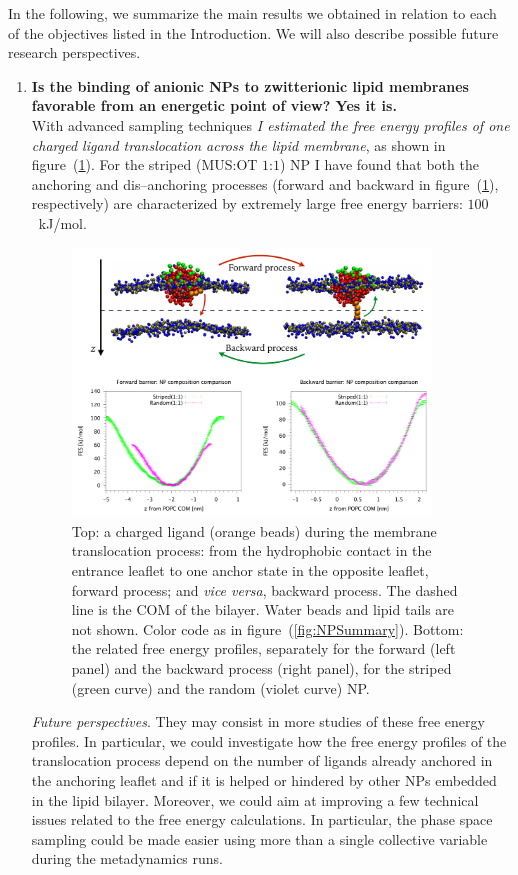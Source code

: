 In the following, we summarize the main results we obtained in relation to each of the objectives listed in the 
Introduction. We will also describe possible future research perspectives.

\begin{enumerate}[label=\itshape\roman*.,listparindent=1em]
	\item \textbf{\textsf{Is the binding of anionic \acp{NP} to zwitterionic lipid membranes favorable from an energetic point of view? Yes it is.}}\\With advanced sampling techniques \textit{I estimated the free energy profiles of one charged ligand translocation across the lipid membrane}, as shown in figure~(\ref{fig:coglionazzo}). For the striped (\acs{MUS}:\acs{OT} $1$:$1$) \ac{NP} I have found that both the anchoring and dis--anchoring processes (forward and backward in figure~(\ref{fig:coglionazzo}), respectively) are characterized by extremely large free energy barriers: $100$~kJ/mol.%
\begin{figure}[ht]
	\center
	\includegraphics[width=0.9\textwidth]{./img/coglionazzo}
	\caption{Top: a charged ligand (orange beads) during the membrane translocation process: from the hydrophobic contact in the entrance leaflet to one anchor state in the opposite leaflet, forward process; and \textit{vice versa}, backward process. The dashed line is the \acs{COM} of the bilayer. Water beads and lipid tails are not shown. Color code as in figure~(\ref{fig:NPSummary}). Bottom: the related free energy profiles, separately for the forward (left panel) and the backward process (right panel), for the striped (green curve) and the random (violet curve) \acs{NP}.}%
	\label{fig:coglionazzo}
\end{figure}%
\newpage
	\indent\textit{Future perspectives}. They may consist in more studies of these free energy profiles. In particular, we could investigate how the free energy profiles of the translocation process depend on the number of ligands already anchored in the anchoring leaflet and if it is helped or hindered by other \acp{NP} embedded in the lipid bilayer. Moreover, we could aim at improving a few technical issues related to the free energy calculations. In particular, the phase space sampling could be made easier using more than a single collective variable during the metadynamics runs.%


\end{enumerate}
